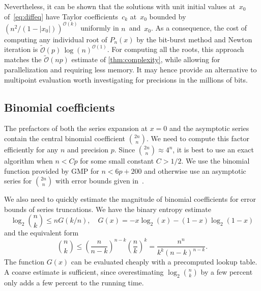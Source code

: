 \documentclass[nohypdvips,review]{siamart0216}
\newcommand{\OO}{\mathcal{O}}
\newcommand{\OOtilde}{\widetilde{\mathcal{O}}}
\begin{document}
Nevertheless, it can be shown that the solutions with unit initial
values at~$x_0$ of~\cref{eq:diffeq} have Taylor
coefficients~$c_k$ at~$x_0$ bounded by
$(n^2/(1-|x_0|))^{\OO(k)}$
uniformly in $n$~and~$x_0$.
As a consequence, the cost of computing any individual root of
$P_n(x)$ by the bit-burst method and Newton iteration is
$\OOtilde(p) \, \log(n)^{\OO(1)}$.
For computing all the roots, this approach matches the $\OOtilde(np)$
estimate of \cref{thm:complexity}, while allowing for
parallelization and requiring less memory.
It may hence provide an alternative to multipoint
evaluation
worth investigating for precisions in the millions of bits.

\subsection{Binomial coefficients}

\label{sec:binomial}

The prefactors of both the series expansion at ${x = 0}$ and the asymptotic series
contain the central binomial coefficient ${2n \choose n}$.
We need to compute this factor efficiently for any $n$ and precision $p$.
Since ${2n \choose n} \approx 4^n$, it is best to use
an exact algorithm when $n < Cp$ for some small constant $C > 1/2$.
We use the binomial function provided by GMP for $n < 6p + 200$
and otherwise use an asymptotic series for ${2n \choose n}$
with error bounds given in~\cite{brent2016asymptotic}.

We also need to quickly estimate the magnitude of binomial coefficients
for error bounds of series truncations.
We have the binary entropy estimate
$$\log_2 {n \choose k} \le n G(k/n), \quad G(x) = -x \log_2(x) - (1-x) \log_2(1-x)$$
and the equivalent form
\begin{equation}
\label{eq:binbound}
{n \choose k} \le \left(\frac{n}{n-k}\right)^{n-k} \left(\frac{n}{k}\right)^k = \frac{n^n}{k^k (n-k)^{n-k}}.
\end{equation}
The function $G(x)$ can be evaluated cheaply with a precomputed
lookup table. A coarse estimate is sufficient, since overestimating
$\log_2 {n \choose k}$ by a few percent only adds a few
percent to the running time.
\end{document}
